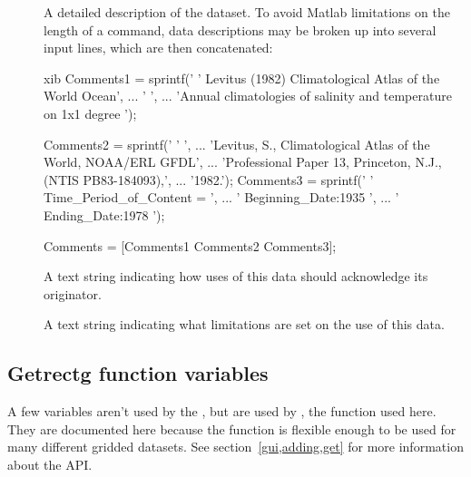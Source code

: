 \begin{description}
\item[] A detailed description of the dataset.  To avoid
  Matlab limitations on the length of a command, data descriptions may
  be broken up into several input lines, which are then concatenated:

\begin{vcode}{xib}
Comments1 = sprintf('%
    '        Levitus (1982) Climatological Atlas of the World Ocean', ...
    '    ', ...
    'Annual climatologies of salinity and temperature on 1x1 degree ');

Comments2 = sprintf('%
    '    ', ...
    'Levitus, S., Climatological Atlas of the World, NOAA/ERL GFDL', ...
    'Professional Paper 13,  Princeton, N.J.,  (NTIS PB83-184093),', ...
    '1982.');
Comments3 = sprintf('%
    '    Time_Period_of_Content = ', ...
    '         Beginning_Date:1935 ', ...
    '         Ending_Date:1978 ');

Comments = [Comments1 Comments2 Comments3];
    
\end{vcode}


\item[] A text string indicating how uses of this
  data should acknowledge its originator.

\item[] A text string indicating what
  limitations are set on the use of this data.

\end{description}

\subsection{Getrectg function variables}

A few variables aren't used by the \GUI, but are used by
, the  function used here.  They are
documented here because the  function is flexible enough
to be used for many different gridded datasets.  See
section~\ref{gui,adding,get} for more information about the
 API.

